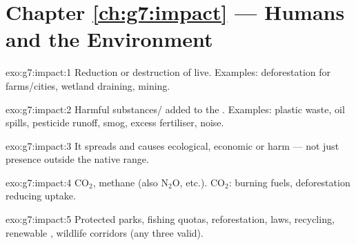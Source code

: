 \section*{Chapter \ref{ch:g7:impact} --- Humans and the Environment}

\begin{solution}{exo:g7:impact:1}
Reduction or destruction of   live. Examples: deforestation
for farms/cities, wetland draining, mining.
\end{solution}

\begin{solution}{exo:g7:impact:2}
Harmful substances/ added to the . Examples: plastic
waste, oil spills, pesticide runoff, smog, excess fertiliser, noise.
\end{solution}

\begin{solution}{exo:g7:impact:3}
It spreads and causes ecological, economic or  harm --- not just
presence outside the native range.
\end{solution}

\begin{solution}{exo:g7:impact:4}
$\mathrm{CO_2}$, methane (also $\mathrm{N_2O}$, etc.). $\mathrm{CO_2}$:
burning  fuels, deforestation reducing uptake.
\end{solution}

\begin{solution}{exo:g7:impact:5}
Protected parks, fishing quotas, reforestation,  laws, recycling,
renewable , wildlife corridors (any three valid).
\end{solution}

